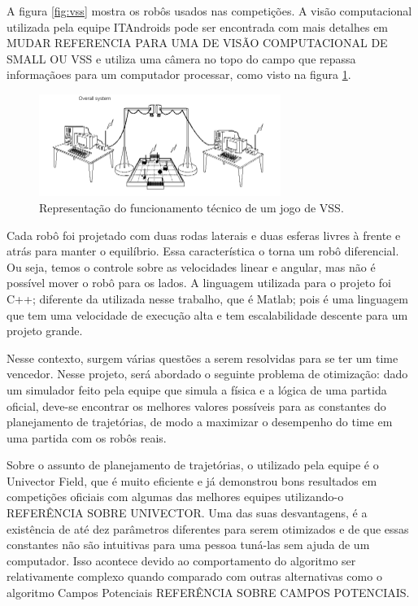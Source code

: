 \documentclass[a4paper,12pt]{article}
\begin{document}
A figura \ref{fig:vss} mostra os robôs usados nas competições. A visão computacional utilizada pela equipe ITAndroids pode ser encontrada com mais detalhes em \cite{tasinaffo_ic} MUDAR REFERENCIA PARA UMA DE VISÃO COMPUTACIONAL DE SMALL OU VSS e utiliza uma câmera no topo do campo que repassa informaçãoes para um computador processar, como visto na figura \ref{fig:funcioamento}.

\begin{figure}[H]
	\centering
		\includegraphics[width=0.7\textwidth]{figures/overview.png}
  \caption{Representação do funcionamento técnico de um jogo de VSS.}
	\label{fig:funcioamento}
\end{figure}

Cada robô foi projetado com duas rodas laterais e duas esferas livres à frente e atrás para manter o equilíbrio. Essa característica o torna um robô diferencial. Ou seja, temos o controle sobre as velocidades linear e angular, mas não é possível mover o robô para os lados. A linguagem utilizada para o projeto foi C++; diferente da utilizada nesse trabalho, que é Matlab; pois é uma linguagem que tem uma velocidade de execução alta e tem escalabilidade descente para um projeto grande. 

Nesse contexto, surgem várias questões a serem resolvidas para se ter um time vencedor. Nesse projeto, será abordado o seguinte problema de otimização: dado um simulador feito pela equipe que simula a física e a lógica de uma partida oficial, deve-se encontrar os melhores valores possíveis para as constantes do planejamento de trajetórias, de modo a maximizar o desempenho do time em uma partida com os robôs reais.

Sobre o assunto de planejamento de trajetórias, o utilizado pela equipe é o Univector Field, que é muito eficiente e já demonstrou bons resultados em competições oficiais com algumas das melhores equipes utilizando-o REFERÊNCIA SOBRE UNIVECTOR. Uma das suas desvantagens, é a existência de até dez parâmetros diferentes para serem otimizados e de que essas constantes não são intuitivas para uma pessoa tuná-las sem ajuda de um computador. Isso acontece devido ao comportamento do algoritmo ser relativamente complexo quando comparado com outras alternativas como o algoritmo Campos Potenciais REFERÊNCIA SOBRE CAMPOS POTENCIAIS.
\end{document}

